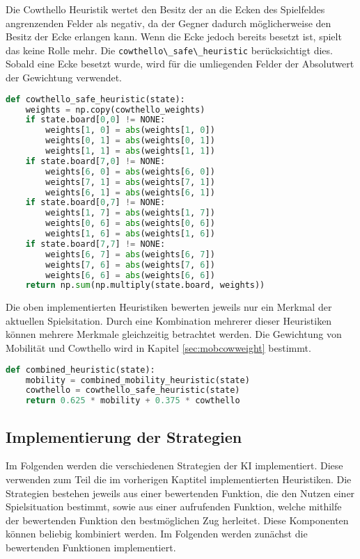Die Cowthello Heuristik wertet den Besitz der an die Ecken des
Spielfeldes angrenzenden Felder als negativ, da der Gegner dadurch
möglicherweise den Besitz der Ecke erlangen kann. Wenn die Ecke jedoch
bereits besetzt ist, spielt das keine Rolle mehr. Die
\passthrough{\lstinline!cowthello\_safe\_heuristic!} berücksichtigt
dies. Sobald eine Ecke besetzt wurde, wird für die umliegenden Felder
der Absolutwert der Gewichtung verwendet.

\begin{lstlisting}[language=Python]
def cowthello_safe_heuristic(state):
    weights = np.copy(cowthello_weights)
    if state.board[0,0] != NONE:
        weights[1, 0] = abs(weights[1, 0])
        weights[0, 1] = abs(weights[0, 1])
        weights[1, 1] = abs(weights[1, 1])
    if state.board[7,0] != NONE:
        weights[6, 0] = abs(weights[6, 0])
        weights[7, 1] = abs(weights[7, 1])
        weights[6, 1] = abs(weights[6, 1])
    if state.board[0,7] != NONE:
        weights[1, 7] = abs(weights[1, 7])
        weights[0, 6] = abs(weights[0, 6])
        weights[1, 6] = abs(weights[1, 6])
    if state.board[7,7] != NONE:
        weights[6, 7] = abs(weights[6, 7])
        weights[7, 6] = abs(weights[7, 6])
        weights[6, 6] = abs(weights[6, 6])
    return np.sum(np.multiply(state.board, weights))
\end{lstlisting}

Die oben implementierten Heuristiken bewerten jeweils nur ein Merkmal
der aktuellen Spielsitation. Durch eine Kombination mehrerer dieser
Heuristiken können mehrere Merkmale gleichzeitig betrachtet werden. Die
Gewichtung von Mobilität und Cowthello wird in Kapitel
\ref{sec:mobcowweight} bestimmt.

\begin{lstlisting}[language=Python]
def combined_heuristic(state):
    mobility = combined_mobility_heuristic(state)
    cowthello = cowthello_safe_heuristic(state)
    return 0.625 * mobility + 0.375 * cowthello
\end{lstlisting}

\hypertarget{implementierung-der-strategien}{%
\subsection{Implementierung der
Strategien}\label{implementierung-der-strategien}}

Im Folgenden werden die verschiedenen Strategien der \ac{KI}
implementiert. Diese verwenden zum Teil die im vorherigen Kaptitel
implementierten Heuristiken. Die Strategien bestehen jeweils aus einer
bewertenden Funktion, die den Nutzen einer Spielsituation bestimmt,
sowie aus einer aufrufenden Funktion, welche mithilfe der bewertenden
Funktion den bestmöglichen Zug herleitet. Diese Komponenten können
beliebig kombiniert werden. Im Folgenden werden zunächst die bewertenden
Funktionen implementiert.

